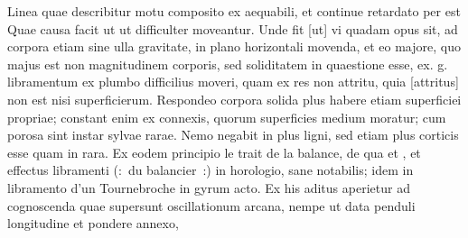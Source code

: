     \pend
    \vspace{1em}
\pstart
Linea quae describitur motu composito ex aequabili, et continue
retardato per est
\pend
\count{}
\count{}
\pstart Quae causa facit ut 
ut difficulter moveantur. Unde fit [ut]
vi quadam opus sit, ad corpora etiam sine ulla gravitate, in plano horizontali
movenda, et eo majore, quo majus est
non magnitudinem corporis, sed soliditatem in quaestione esse, ex. g. libramentum
ex plumbo difficilius moveri, quam ex
res non attritu, quia [attritus]
non est nisi superficierum. Respondeo corpora solida plus habere
etiam superficiei propriae; constant enim ex
connexis, quorum superficies medium moratur; cum porosa sint instar sylvae rarae.
Nemo negabit in 
plus ligni, sed etiam plus corticis esse quam in rara.
Ex eodem principio le trait de la balance, de qua
et ,
et effectus libramenti\protect{} (:~du balancier~:)
in horologio\protect{}, sane notabilis; idem in libramento d'un Tournebroche in gyrum acto.
\pend
\pstart
Ex his aditus aperietur ad cognoscenda quae supersunt oscillationum arcana,
nempe ut data penduli\protect{} longitudine et pondere\protect{} annexo,
